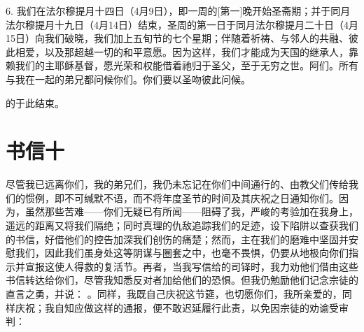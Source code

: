 6. 我们在法尔穆提月十四日（4月9日），即一周的[第一]晚开始圣斋期；并于同月法尔穆提月十九日（4月14日）结束，圣周的第一日于同月法尔穆提月二十日（4月15日）向我们破晓，我们加上五旬节的七个星期；伴随着祈祷、与邻人的共融、彼此相爱，以及那超越一切的和平意愿。因为这样，我们才能成为天国的继承人，靠赖我们的主耶稣基督，愿光荣和权能借着祂归于圣父，至于无穷之世。阿们。所有与我在一起的弟兄都问候你们。你们要以圣吻彼此问候。\par

的于此结束。\par



\section{书信十}

 \par

尽管我已远离你们，我的弟兄们，我仍未忘记在你们中间通行的、由教父们传给我们的惯例，即不可缄默不语，而不将年度圣节的时间及其庆祝之日通知你们。因为，虽然那些苦难——你们无疑已有所闻——阻碍了我，严峻的考验加在我身上，遥远的距离又将我们隔绝；同时真理的仇敌追踪我们的足迹，设下陷阱以查获我们的书信，好借他们的控告加深我们创伤的痛楚；然而，主在我们的磨难中坚固并安慰我们，因此我们虽身处这等阴谋与圈套之中，也毫不畏惧，仍要从地极向你们指示并宣报这使人得救的复活节。再者，当我写信给的司铎时，我力劝他们借由这些书信转达给你们，尽管我知悉反对者加给他们的恐惧。但我仍勉励他们记念宗徒的直言之勇，并说： 。同样，我既自己庆祝这节筵，也切愿你们，我所亲爱的，同样庆祝；我自知应做这样的通报，便不敢迟延履行此责，以免因宗徒的劝谕受审判：\par

